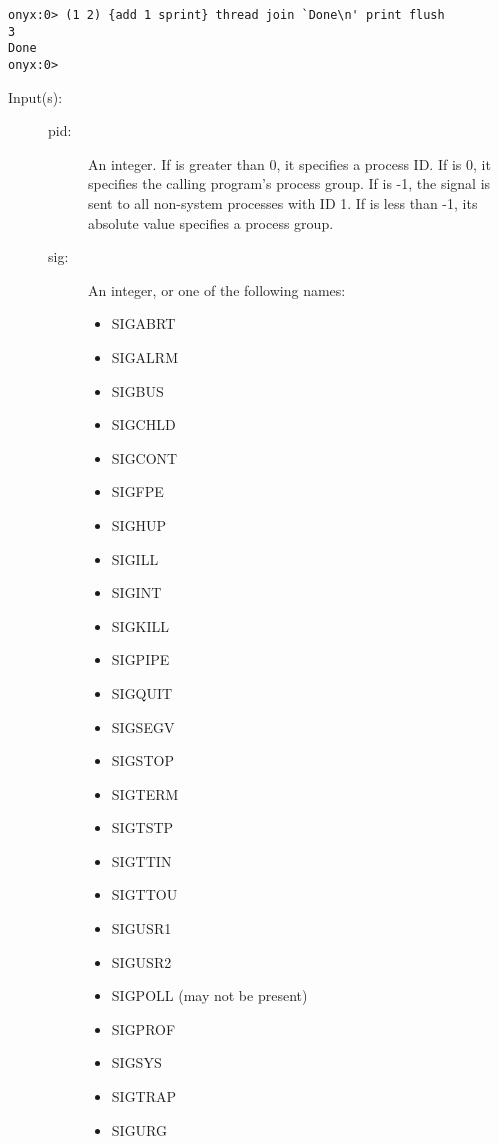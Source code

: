 \begin{description}
\begin{description}
\begin{verbatim}
onyx:0> (1 2) {add 1 sprint} thread join `Done\n' print flush
3
Done
onyx:0>
		\end{verbatim}
	\end{description}
\label{systemdict:kill}
\item[{\onyxop{pid sig}{kill}{--}}: ]
	\begin{description}\item[]
	\item[Input(s): ]
		\begin{description}\item[]
		\item[pid: ]
			An integer.  If  is greater than 0, it
			specifies a process ID.  If  is 0, it
			specifies the calling program's process group.  If
			 is -1, the signal is sent to all non-system
			processes with ID 1.  If  is less than -1,
			its absolute value specifies a process group.
		\item[sig: ]
			An integer, or one of the following names:
			\begin{itemize}
			\item{SIGABRT}
			\item{SIGALRM}
			\item{SIGBUS}
			\item{SIGCHLD}
			\item{SIGCONT}
			\item{SIGFPE}
			\item{SIGHUP}
			\item{SIGILL}
			\item{SIGINT}
			\item{SIGKILL}
			\item{SIGPIPE}
			\item{SIGQUIT}
			\item{SIGSEGV}
			\item{SIGSTOP}
			\item{SIGTERM}
			\item{SIGTSTP}
			\item{SIGTTIN}
			\item{SIGTTOU}
			\item{SIGUSR1}
			\item{SIGUSR2}
			\item{SIGPOLL (may not be present)}
			\item{SIGPROF}
			\item{SIGSYS}
			\item{SIGTRAP}
			\item{SIGURG}

\end{itemize}
\end{description}
\end{description}
\end{description}
